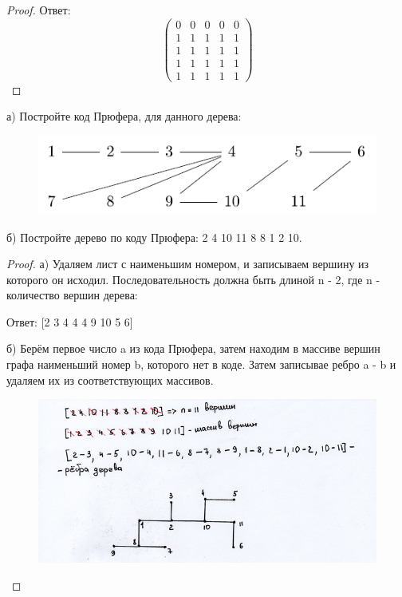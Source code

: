 \begin{proof}
 Ответ:
 \[\begin{pmatrix}
        0 & 0 & 0 & 0 & 0\\
        1 & 1 & 1 & 1 & 1\\
        1 & 1 & 1 & 1 & 1\\
        1 & 1 & 1 & 1 & 1\\
        1 & 1 & 1 & 1 & 1
    \end{pmatrix}\]
\end{proof}

\begin{problem}[4]
	а) Постройте код Прюфера, для данного дерева:
 
    \begin{figure}[h]
     \centering
     \includegraphics[width=0.5\linewidth]{pics/4thGraph.png}
     \label{fig:dm}
    \end{figure}

    б) Постройте дерево по коду Прюфера: 2 4 10 11 8 8 1 2 10.
\end{problem}

\begin{proof}
    а) Удаляем лист с наименьшим номером, и записываем вершину из которого он исходил. Последовательность должна быть длиной n - 2, где n - количество вершин дерева:
   
    Ответ: [2 3 4 4 4 9 10 5 6]

    б) Берём первое число a из кода Прюфера, затем находим в массиве вершин графа наименьший номер b, которого нет в коде. Затем записывае ребро a - b и удаляем их из соответствующих массивов.

    \begin{figure}[h]
     \centering
     \includegraphics[width=0.7\linewidth]{pics/4thBsolution.png}
     \label{fig:dm}
    \end{figure}
    
\end{proof}


